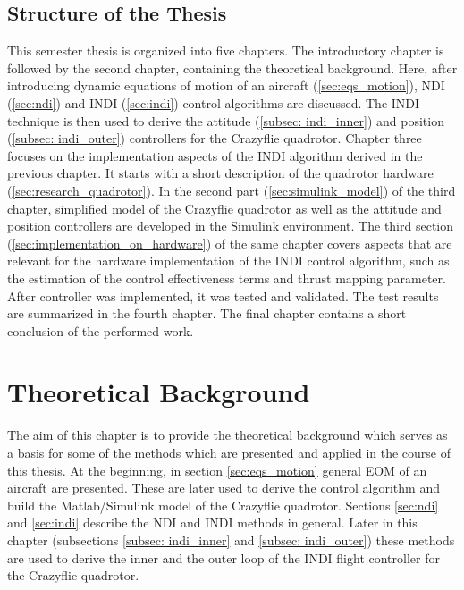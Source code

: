 \documentclass[11pt, a4paper, twoside]{report}
\begin{document}

\section{Structure of the Thesis} \label{sec:structure_ofthe_thesis} 

This semester thesis is organized into five chapters. The introductory chapter is followed by the second chapter, containing the theoretical background. Here, after introducing dynamic equations of motion of an aircraft (\ref{sec:eqs_motion}), \acrshort{NDI} (\ref{sec:ndi}) and \acrshort{INDI} (\ref{sec:indi}) control algorithms are discussed. The \acrshort{INDI} technique is then used to derive the attitude (\ref{subsec: indi_inner}) and position (\ref{subsec: indi_outer}) controllers for the Crazyflie quadrotor. Chapter three focuses on the implementation aspects of the \acrshort{INDI} algorithm derived in the previous chapter. It starts with a short description of the quadrotor hardware (\ref{sec:research_quadrotor}). In the second part (\ref{sec:simulink_model}) of the third chapter, simplified model of the Crazyflie quadrotor as well as the attitude and position controllers are developed in the Simulink environment. The third section (\ref{sec:implementation_on_hardware}) of the same chapter covers aspects that are relevant for the hardware implementation of the \acrshort{INDI} control algorithm, such as the estimation of the control effectiveness terms and thrust mapping parameter. After controller was implemented, it was tested and validated. The test results are summarized in the fourth chapter. The final chapter contains a short conclusion of the performed work.


\chapter{Theoretical Background} \label{cha:theoretical_background}

The aim of this chapter is to provide the theoretical background which serves as a basis for some of the methods which are presented and applied in the course of this thesis. At the beginning, in section \ref{sec:eqs_motion} general \acrfull{EOM} of an aircraft are presented. These are later used to derive the control algorithm and build the Matlab/Simulink model of the Crazyflie quadrotor. Sections \ref{sec:ndi} and \ref{sec:indi} describe the \acrfull{NDI} and \acrfull{INDI} methods in general. Later in this chapter (subsections \ref{subsec: indi_inner} and \ref{subsec: indi_outer}) these methods are used to derive the inner and the outer loop of the \acrshort{INDI} flight controller for the Crazyflie quadrotor.
\end{document}
